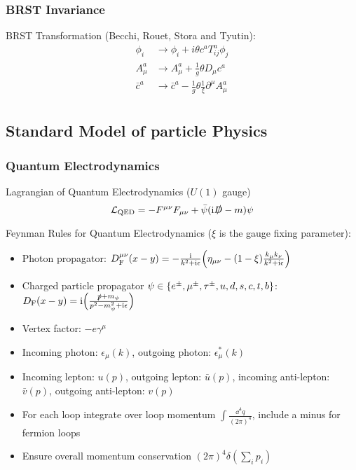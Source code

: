 		\subsubsection{BRST Invariance}
			BRST Transformation (Becchi, Rouet, Stora and Tyutin):
			\begin{equation}
				\begin{aligned}
					\phi_i & \to \phi_i + i\theta c^a T^a_{ij} \phi_j \\
					A^a_\mu & \to A^a_\mu + \frac{1}{g}\theta D_\mu c^a \\
					\bar{c}^a & \to \bar{c}^a - \frac{1}{g} \theta \frac{1}{\xi} \partial^\mu A^a_\mu \\
				\end{aligned}
			\end{equation}


	\subsection{Standard Model of particle Physics}

		\subsubsection{Quantum Electrodynamics}
			Lagrangian of Quantum Electrodynamics ($U(1)$ gauge)
			\begin{equation}
				\mathcal{L}_\mathrm{QED} = -F^{\mu\nu}F_{\mu\nu} + \bar{\psi}(\mathrm{i}\slashed{D}-m)\psi
			\end{equation}

			\noindent
			Feynman Rules for Quantum Electrodynamics ($\xi$ is the gauge fixing parameter):
			\begin{itemize}\itemsep -0pt
				\item Photon propagator: $D_\text{F}^{\mu\nu}(x-y) = -\frac{\mathrm{i}}{k^2+\mathrm{i}\epsilon} \qty(\eta_{\mu\nu}-(1-\xi)\frac{k_\mu k_\nu}{k^2+\mathrm{i}\epsilon} )$
				\item Charged particle propagator $\psi \in \qty{e^\pm, \mu^\pm ,\tau^\pm, u,d,s,c,t,b}$: $D_\text{F}(x-y) = \mathrm{i}\qty(\frac{\slashed{p}+m_\psi}{p^2-m_\psi^2+\mathrm{i}\epsilon})$
				\item Vertex factor: $-e\gamma^\mu$
				\item Incoming photon: $\epsilon_\mu(k)$, outgoing photon: $\epsilon^{*}_\mu(k)$
				\item Incoming lepton: $u(p)$, outgoing lepton: $\bar{u}(p)$, incoming anti-lepton: $\bar{v}(p)$, outgoing anti-lepton: $v(p)$
				\item For each loop integrate over loop momentum $\int \frac{\dd^4 q}{(2\pi)^4}$, include a minus for fermion loops
				\item Ensure overall momentum conservation $(2\pi)^4 \delta(\sum_i p_i)$
			\end{itemize}

